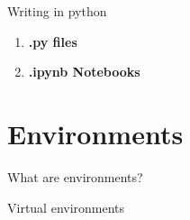 \documentclass[aspectratio=169]{beamer}
\begin{document}
\begin{frame}{Writing in python}
	\begin{enumerate}
		\item \textbf{.py files}
		
		\item \textbf{.ipynb Notebooks}
	\end{enumerate}
\end{frame}


\section{Environments}

\begin{frame}{What are environments?}
 	
\end{frame}

\begin{frame}{Virtual environments}
 	
\end{frame}
\end{document}

